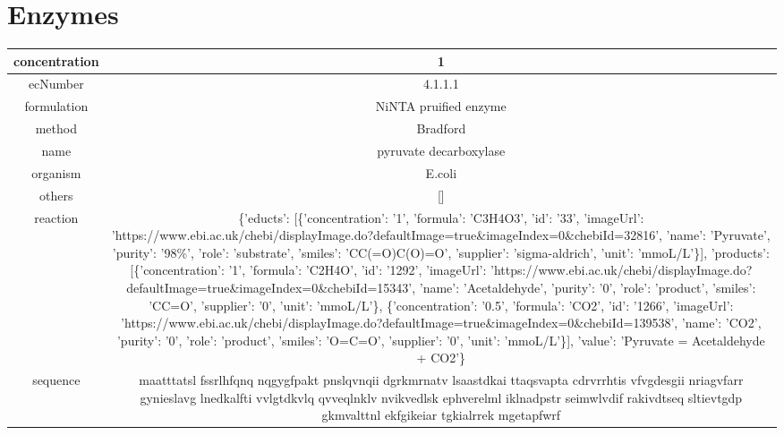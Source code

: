 \documentclass{article}%
\begin{document}
%
\section{Enzymes}%
\label{sec:Enzymes}%
\begin{tabular}{|c|c|}%
\hline%
concentration&1\\%
\hline%
ecNumber&4.1.1.1\\%
\hline%
formulation&NiNTA pruified enzyme\\%
\hline%
method&Bradford\\%
\hline%
name&pyruvate decarboxylase\\%
\hline%
organism&E.coli\\%
\hline%
others&{[}{]}\\%
\hline%
reaction&\{'educts': {[}\{'concentration': '1', 'formula': 'C3H4O3', 'id': '33', 'imageUrl': 'https://www.ebi.ac.uk/chebi/displayImage.do?defaultImage=true\&imageIndex=0\&chebiId=32816', 'name': 'Pyruvate', 'purity': '98\%', 'role': 'substrate', 'smiles': 'CC(=O)C(O)=O', 'supplier': 'sigma{-}aldrich', 'unit': 'mmoL/L'\}{]}, 'products': {[}\{'concentration': '1', 'formula': 'C2H4O', 'id': '1292', 'imageUrl': 'https://www.ebi.ac.uk/chebi/displayImage.do?defaultImage=true\&imageIndex=0\&chebiId=15343', 'name': 'Acetaldehyde', 'purity': '0', 'role': 'product', 'smiles': 'CC=O', 'supplier': '0', 'unit': 'mmoL/L'\}, \{'concentration': '0.5', 'formula': 'CO2', 'id': '1266', 'imageUrl': 'https://www.ebi.ac.uk/chebi/displayImage.do?defaultImage=true\&imageIndex=0\&chebiId=139538', 'name': 'CO2', 'purity': '0', 'role': 'product', 'smiles': 'O=C=O', 'supplier': '0', 'unit': 'mmoL/L'\}{]}, 'value': 'Pyruvate = Acetaldehyde + CO2'\}\\%
\hline%
sequence&maatttatsl fssrlhfqnq \newline%
nqgygfpakt pnslqvnqii \newline%
dgrkmrnatv lsaastdkai\newline%
ttaqsvapta cdrvrrhtis \newline%
vfvgdesgii nriagvfarr \newline%
gynieslavg lnedkalfti\newline%
vvlgtdkvlq qvveqlnklv \newline%
nvikvedlsk ephverelml \newline%
iklnadpstr seimwlvdif\newline%
rakivdtseq sltievtgdp \newline%
gkmvalttnl ekfgikeiar \newline%
tgkialrrek mgetapfwrf\newline%

\end{tabular}
\end{document}
